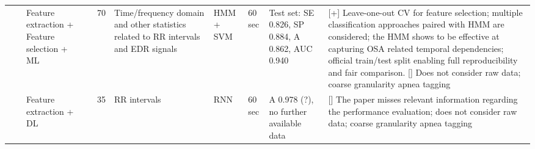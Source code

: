 \documentclass[5p,twocolumn,lefttitle]{elsarticle}
\begin{document}
\begin{table*}[!ht]
{\begin{tabularx}{2\textwidth}{@{}m{2.5em}p{7em}p{10em}lp{2em}p{12em}p{7em}p{3em}p{17em}X@{}}
                            \cmidrule(l){3-10} 
                            &                                                         & Feature extraction + Feature selection + ML                    & \cite{DBLP:journals/tbe/SongLZCX16}      & 70            & Time/frequency domain and other statistics related to RR intervals and EDR signals                                & HMM + SVM                           & 60 sec                                     & Test set: SE 0.826, SP 0.884, A 0.862, AUC 0.940                                                                                                                                        & [+] Leave-one-out CV for feature selection; multiple classification approaches paired with HMM are considered; the HMM shows to be effective at capturing OSA related temporal dependencies; official train/test split enabling full reproducibility and fair comparison. [] Does not consider raw data; coarse granularity apnea tagging                                                                                                         \\
                            \cmidrule(l){3-10} 
                            &                                                         & Feature extraction + DL                                        & \cite{DBLP:conf/cse/ChengSJKL17}         & 35            & RR intervals                                                                                                      & RNN                                 & 60 sec                                     & A 0.978 (?), no further available data                                                                                                                                                & [] The paper misses relevant information regarding the performance evaluation; does not consider raw data; coarse granularity apnea tagging                                                                                                                                                                                                                                                                                                        \\
                            \cmidrule(l){3-10} 

\end{tabularx}}
\end{table*}
\end{document}
